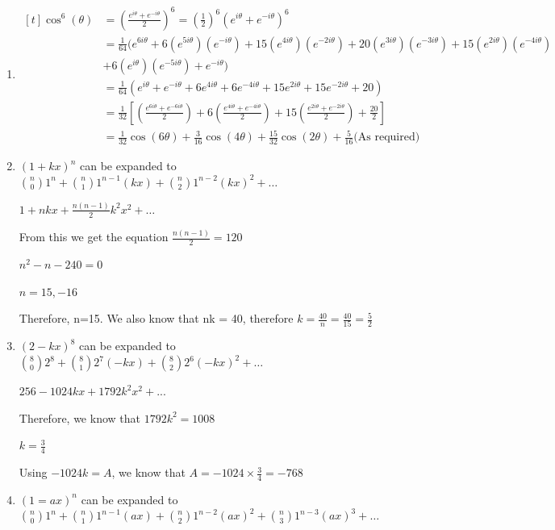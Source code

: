 \documentclass[../main.tex]{subfiles}
\begin{document}
\begin{enumerate}
    \item
    $
    \!
    \begin{aligned}[t]
     \cos^6(\theta)
        &=(\frac{e^{i\theta}+e^{-i\theta}}{2})^6= (\frac{1}{2})^6(e^{i\theta}+e^{-i\theta})^6 \\
        &= \frac{1}{64}(e^{6i\theta}+6(e^{5i\theta})(e^{-i\theta})+15(e^{4i\theta})(e^{-2i\theta})+20(e^{3i\theta})(e^{-3i\theta})+15(e^{2i\theta})(e^{-4i\theta})\\
        &+6(e^{i\theta})(e^{-5i\theta})+e^{-i\theta})\\
        &=\frac{1}{64}(e^{i\theta}+e^{-i\theta}+6e^{4i\theta}+6e^{-4i\theta}+15e^{2i\theta}+15e^{-2i\theta}+20)\\
        &=\frac{1}{32}[(\frac{e^{6i\theta}+e^{-6i\theta}}{2})+6(\frac{e^{4i\theta}+e^{-4i\theta}}{2})+15(\frac{e^{2i\theta}+e^{-2i\theta}}{2})+\frac{20}{2}]\\
        &=\frac{1}{32}\cos(6\theta)+\frac{3}{16}\cos(4\theta)+\frac{15}{32}\cos(2\theta)+\frac{5}{16} \text{(As required)}
    \end{aligned}
    $

    \item 
    \( (1+kx)^n \) can be expanded to \({n \choose 0}1^n +{n \choose 1}1^{n-1}(kx)+{n \choose 2}1^{n-2}(kx)^2+\dots \)

    \(1 + nkx + \frac{n(n-1)}{2}k^2x^2+\dots \)

    From this we get the equation \(\frac{n(n-1)}{2}=120\)

    \(n^2-n-240=0\)

    \(n=15, -16\)

    Therefore, n=15. We also know that nk = 40, therefore $k=\frac{40}{n}=\frac{40}{15}=\frac{5}{2}$

    \item 
    \((2-kx)^8 \) can be expanded to \({8 \choose 0}2^8 + {8 \choose 1}2^7(-kx) + {8 \choose 2}2^6(-kx)^2+\dots \)

    \(256-1024kx+1792k^2x^2+... \)

    Therefore, we know that \(1792k^2=1008\)

    \(k=\frac{3}{4}\)

    Using \(-1024k=A\), we know that \(A=-1024\times \frac{3}{4}=-768\)


    \item 
    \((1=ax)^n \) can be expanded to \({n \choose 0}1^n +{n \choose 1}1^{n-1}(ax)+{n \choose 2}1^{n-2}(ax)^2+{n \choose 3}1^{n-3}(ax)^3+\dots \)


\end{enumerate}
\end{document}
